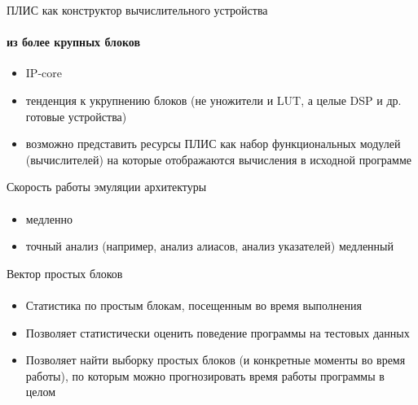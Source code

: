 \documentclass{beamer}              %
\begin{document}
\begin{frame}{ПЛИС как конструктор вычислительного устройства}
  \framesubtitle{из более крупных блоков}
  
  \begin{itemize}
      \item IP-core
      \item тенденция к укрупнению блоков (не уножители и LUT, а целые DSP и др. готовые устройства) 
      \item возможно представить ресурсы ПЛИС как набор функциональных модулей (вычислителей) на которые отображаются вычисления в исходной программе
 \end{itemize}
  
\end{frame}

\begin{frame}{Скорость работы эмуляции архитектуры}
  \framesubtitle{}
  
  \begin{itemize}
      \item медленно
      \item точный анализ (например, анализ алиасов, анализ указателей) медленный
  \end{itemize}

\end{frame}

\begin{frame}{Вектор простых блоков}
  \framesubtitle{}
  
  \begin{itemize}
      \item Статистика по простым блокам, посещенным во время выполнения \footnotemark
      \item Позволяет статистически оценить поведение программы на тестовых данных
      \item Позволяет найти выборку простых блоков (и конкретные моменты во время работы), по которым можно прогнозировать время работы программы в целом
  \end{itemize}
  
\end{frame}
\end{document}
